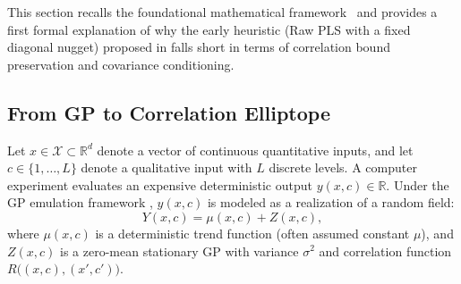 \documentclass[default,sn-mathphys,Numbered]{sn-jnl}
\theoremstyle{thmstyleone}
\theoremstyle{thmstylethree}
\theoremstyle{thmstyletwo}
\begin{document}
This section recalls the foundational mathematical framework~\citep{saves2023high,Mixed_Paul} and provides a first formal explanation of why the early heuristic (Raw PLS with a fixed diagonal nugget) proposed in \citet{saves2023high} falls short in terms of correlation bound preservation and covariance conditioning.

\subsection{From GP to Correlation Elliptope}

Let $x \in \mathcal{X} \subset \mathbb{R}^d$ denote a vector of continuous quantitative inputs, and let $c \in \{1, \ldots, L\}$ denote a qualitative input with $L$ discrete levels. A computer experiment evaluates an expensive deterministic output $y(x, c) \in \mathbb{R}$. Under the GP emulation framework \citep{DACE,williams2006gaussian,Kennedy_Bayes,PDUDE}, $y(x, c)$ is modeled as a realization of a random field:
\begin{equation}
\label{eq:gp_model}
Y(x, c) = \mu(x, c) + Z(x, c),
\end{equation}
where $\mu(x, c)$ is a deterministic trend function (often assumed constant $\mu$), and $Z(x, c)$ is a zero-mean stationary GP with variance $\sigma^2$ and correlation function $R\bigl((x, c), (x', c')\bigr)$.
\end{document}

